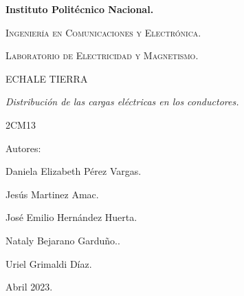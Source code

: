 \documentclass[10pt]{article}
\begin{document}
\pagestyle{fancy}
\cfoot{}


\lhead{}

\begin{titlepage}

	\begin{figure}[t]
		\hspace{0.6\textwidth}
	\end{figure}

	\centering
	{\bfseries\Huge Instituto Politécnico Nacional. \par}
	\vspace{1cm}
	{\scshape\Large Ingeniería en Comunicaciones y Electrónica. \par}
	\vspace{0.3cm}
	{\scshape\Large Laboratorio de Electricidad y Magnetismo.  \par}
	\vspace{1cm}
	{\scshape\Huge ECHALE TIERRA \par}
	\vspace{1cm}
	{\itshape\Large Distribución de las cargas eléctricas en los conductores. \par}
	{\Large 2CM13\par}
	\vfill
	{\Large Autores: \par}
	{\Large Daniela Elizabeth Pérez Vargas. \par}
	{\Large Jesús Martinez Amac. \par}
	{\Large José Emilio Hernández Huerta. \par}
	{\Large Nataly Bejarano Garduño..\par}
	{\Large Uriel Grimaldi Díaz.  \par}
	\vfill
	{\Large Abril 2023. \par}

\end{titlepage}
\end{document}
